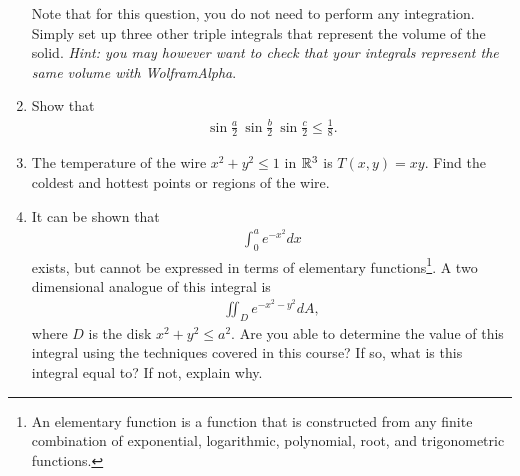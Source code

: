 \documentclass{article}
\begin{document}
\begin{enumerate}
Note that for this question, you do not need to perform any integration. Simply set up three other triple integrals that represent the volume of the solid.
\textit{Hint: you may however want to check that your integrals represent the same volume with WolframAlpha}.
\item %
Show that 
\begin{align*}
  \sin\frac{a}{2} \ \sin\frac{b}{2} \ \sin\frac{c}{2}\le\frac{1}{8}.
\end{align*}
\item %
The temperature of the wire $x^2+y^2\le1$ in $\mathbb{R}^3$ is $T(x,y)=xy$. Find the coldest and hottest points or regions of the wire. 
\item %
It can be shown that 
\begin{align*}
  \int_0^a e^{-x^2}dx 
\end{align*}
exists, but cannot be expressed in terms of elementary functions\footnote{An elementary function is a function that is constructed from any finite combination of exponential, logarithmic, polynomial, root, and trigonometric functions.}. A two dimensional analogue of this integral is
\begin{align*}
  \iint_D e^{-x^2-y^2} dA,
\end{align*}
where $D$ is the disk $x^2+y^2\le a^2$. Are you able to determine the value of this integral using the techniques covered in this course? If so, what is this integral equal to? If not, explain why. 


\end{enumerate}
\end{document}
